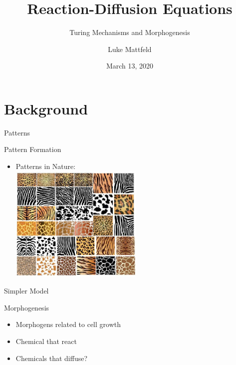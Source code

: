 \documentclass[t,10pt,fleqn]{beamer}
\title[Reaction-Diffusion Equations]%
      {Reaction-Diffusion Equations}
\subtitle{Turing Mechanisms and Morphogenesis}
\author[Luke Mattfeld]{Luke Mattfeld}
\institute[EWU]{Eastern Washington University}
\date{March 13, 2020}
\begin{document}
\begin{frame}
\titlepage

\end{frame}
\section{Background}
\begin{frame}{Patterns}
\vspace{-.3cm}
\begin{block}{Pattern Formation}
  \begin{itemize}
    \pause
    \item Patterns in Nature:
    \pause
    \\
    \includegraphics[width=0.5\textwidth]{creature_patterns2.png}
  \end{itemize}
\end{block}
\pause
\end{frame}

\begin{frame}{Simpler Model}
  \vspace{-.3cm}
  \begin{block}{Morphogenesis}
    \begin{itemize}
      \pause
      \item Morphogens related to cell growth
      \pause
      \item Chemical that react
      \pause
      \item Chemicals that diffuse?
      \pause
    \end{itemize}
  \end{block}
  \pause
  \end{frame}
\end{document}
